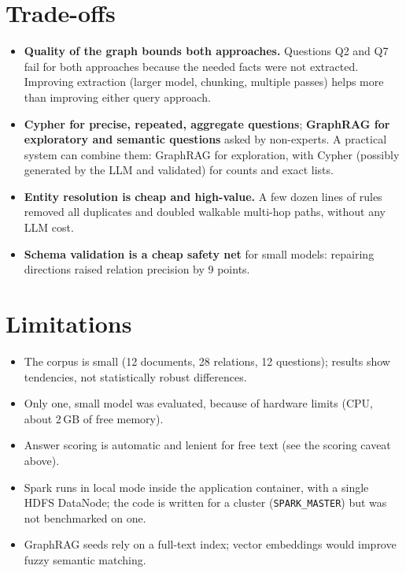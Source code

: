 \documentclass[11pt,a4paper]{report}
\begin{document}
\section{Trade-offs}
\begin{itemize}
  \item \textbf{Quality of the graph bounds both approaches.} Questions Q2 and Q7 fail for both approaches because
        the needed facts were not extracted. Improving extraction (larger model, chunking, multiple passes) helps
        more than improving either query approach.
  \item \textbf{Cypher for precise, repeated, aggregate questions}; \textbf{GraphRAG for exploratory and semantic
        questions} asked by non-experts. A practical system can combine them: GraphRAG for exploration, with
        Cypher (possibly generated by the LLM and validated) for counts and exact lists.
  \item \textbf{Entity resolution is cheap and high-value.} A few dozen lines of rules removed all duplicates and
        doubled walkable multi-hop paths, without any LLM cost.
  \item \textbf{Schema validation is a cheap safety net} for small models: repairing directions raised relation
        precision by 9 points.
\end{itemize}

\section{Limitations}
\begin{itemize}
  \item The corpus is small (12 documents, 28 relations, 12 questions); results show tendencies, not statistically
        robust differences.
  \item Only one, small model was evaluated, because of hardware limits (CPU, about 2\,GB of free memory).
  \item Answer scoring is automatic and lenient for free text (see the scoring caveat above).
  \item Spark runs in local mode inside the application container, with a single HDFS DataNode; the code is
        written for a cluster (\texttt{SPARK\_MASTER}) but was not benchmarked on one.
  \item GraphRAG seeds rely on a full-text index; vector embeddings would improve fuzzy semantic matching.
\end{itemize}
\end{document}
